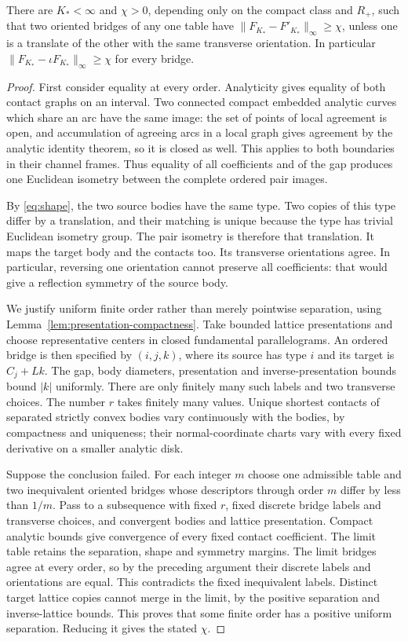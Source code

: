 \begin{lemma}
\label{lem:finite-separation}
There are $K_*<\infty$ and $\chi>0$, depending only on the compact
class and $R_+$, such that two oriented bridges of any one table have
$\|F_{K_*}-F'_{K_*}\|_\infty\ge\chi$, unless one is a translate
of the other with the same transverse orientation. In particular
$\|F_{K_*}-\iota F_{K_*}\|_\infty\ge\chi$ for every bridge.
\end{lemma}
\begin{proof}
First consider equality at every order. Analyticity gives equality of
both contact graphs on an interval. Two connected compact embedded
analytic curves which share an arc have the same image: the set of
points of local agreement is open, and accumulation of agreeing arcs
in a local graph gives agreement by the analytic identity theorem, so
it is closed as well. This applies to both boundaries in their channel
frames. Thus equality of all coefficients and of the gap produces one
Euclidean isometry between the complete ordered pair images.

By \eqref{eq:shape}, the two source bodies have the same type. Two
copies of this type differ by a translation, and their matching is
unique because the type has trivial Euclidean isometry group. The pair
isometry is therefore that translation. It maps the target body and the
contacts too. Its transverse orientations agree. In particular, reversing
one orientation cannot preserve all coefficients: that would give a
reflection symmetry of the source body.

We justify uniform finite order rather than merely pointwise separation,
using Lemma~\ref{lem:presentation-compactness}.
Take bounded lattice presentations and choose representative centers in
closed fundamental parallelograms. An ordered bridge is then specified
by $(i,j,k)$, where its source has type $i$ and its target is $C_j+Lk$.
The gap, body diameters, presentation and inverse-presentation bounds
bound $|k|$ uniformly. There are only finitely many such labels and
two transverse choices. The number $r$ takes finitely many values.
Unique shortest contacts of separated strictly convex bodies vary
continuously with the bodies, by compactness and uniqueness; their
normal-coordinate charts vary with every fixed derivative on a smaller
analytic disk.

Suppose the conclusion failed. For each integer $m$ choose one admissible
table and two inequivalent oriented bridges whose descriptors through
order $m$ differ by less than $1/m$. Pass to a subsequence with fixed
$r$, fixed discrete bridge labels and transverse choices, and convergent
bodies and lattice presentation. Compact analytic bounds give convergence
of every fixed contact coefficient. The limit table retains the separation,
shape and symmetry margins. The limit bridges agree at every order, so
by the preceding argument their discrete labels and orientations are
equal. This contradicts the fixed inequivalent labels. Distinct target
lattice copies cannot merge in the limit, by the positive separation and
inverse-lattice bounds. This proves that some finite order has a positive
uniform separation. Reducing it gives the stated $\chi$.
\end{proof}

